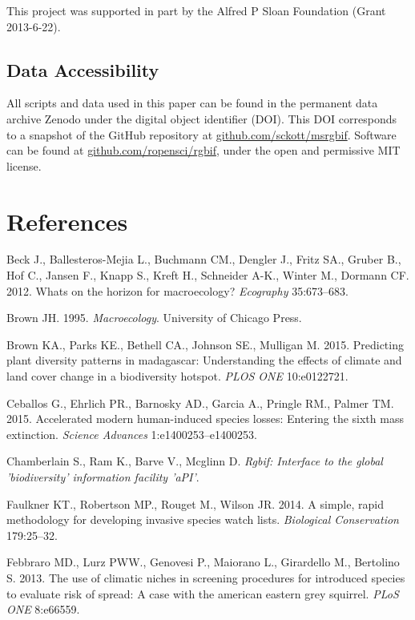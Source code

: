 \documentclass[author-year, review, 11pt]{components/elsarticle} %
\begin{document}
This project was supported in part by the Alfred P Sloan Foundation
(Grant 2013-6-22).

\subsection{Data Accessibility}\label{data-accessibility}

All scripts and data used in this paper can be found in the permanent
data archive Zenodo under the digital object identifier (DOI). This DOI
corresponds to a snapshot of the GitHub repository at
\href{https://github.com/sckott/msrgbif}{github.com/sckott/msrgbif}.
Software can be found at
\href{https://github.com/ropensci/rgbif}{github.com/ropensci/rgbif},
under the open and permissive MIT license.

\section*{References}\label{references}

Beck J., Ballesteros-Mejia L., Buchmann CM., Dengler J., Fritz SA.,
Gruber B., Hof C., Jansen F., Knapp S., Kreft H., Schneider A-K., Winter
M., Dormann CF. 2012. Whats on the horizon for macroecology?
\emph{Ecography} 35:673--683.

Brown JH. 1995. \emph{Macroecology}. University of Chicago Press.

Brown KA., Parks KE., Bethell CA., Johnson SE., Mulligan M. 2015.
Predicting plant diversity patterns in madagascar: Understanding the
effects of climate and land cover change in a biodiversity hotspot.
\emph{PLOS ONE} 10:e0122721.

Ceballos G., Ehrlich PR., Barnosky AD., Garcia A., Pringle RM., Palmer
TM. 2015. Accelerated modern human-induced species losses: Entering the
sixth mass extinction. \emph{Science Advances} 1:e1400253--e1400253.

Chamberlain S., Ram K., Barve V., Mcglinn D. \emph{Rgbif: Interface to
the global 'biodiversity' information facility 'aPI'}.

Faulkner KT., Robertson MP., Rouget M., Wilson JR. 2014. A simple, rapid
methodology for developing invasive species watch lists.
\emph{Biological Conservation} 179:25--32.

Febbraro MD., Lurz PWW., Genovesi P., Maiorano L., Girardello M.,
Bertolino S. 2013. The use of climatic niches in screening procedures
for introduced species to evaluate risk of spread: A case with the
american eastern grey squirrel. \emph{PLoS ONE} 8:e66559.
\end{document}

